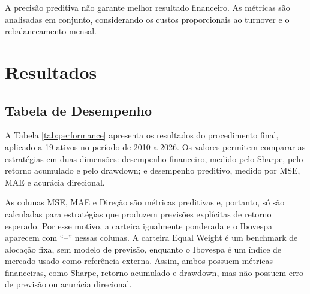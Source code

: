 \documentclass[12pt,a4paper]{article}
\begin{document}
A precisão preditiva não garante melhor resultado financeiro. As métricas são analisadas em conjunto, considerando os custos proporcionais ao turnover e o rebalanceamento mensal.
\section{Resultados}

\subsection{Tabela de Desempenho}

A Tabela \ref{tab:performance} apresenta os resultados do procedimento final, aplicado a 19 ativos no período de 2010 a 2026. Os valores permitem comparar as estratégias em duas dimensões: desempenho financeiro, medido pelo Sharpe, pelo retorno acumulado e pelo drawdown; e desempenho preditivo, medido por MSE, MAE e acurácia direcional.

\begin{table}[H]
\centering
\small
{}
\caption{Resumo do desempenho das estratégias}
\label{tab:performance}
\end{table}

As colunas MSE, MAE e Direção são métricas preditivas e, portanto, só são calculadas para estratégias que produzem previsões explícitas de retorno esperado. Por esse motivo, a carteira igualmente ponderada e o Ibovespa aparecem com ``--'' nessas colunas. A carteira Equal Weight é um benchmark de alocação fixa, sem modelo de previsão, enquanto o Ibovespa é um índice de mercado usado como referência externa. Assim, ambos possuem métricas financeiras, como Sharpe, retorno acumulado e drawdown, mas não possuem erro de previsão ou acurácia direcional.
\end{document}
